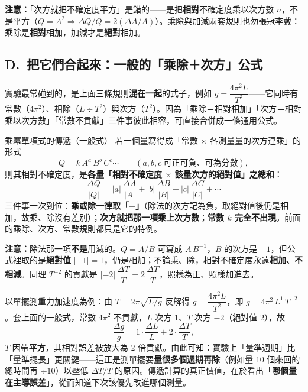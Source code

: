 \documentclass[11pt]{article}
\begin{document}
\textbf{注意：}「次方就把不確定度平方」是錯的——是把\textbf{相對}不確定度乘以次方數 $n$，不是平方（$Q=A^2\Rightarrow \Delta Q/Q=2(\Delta A/A)$）。乘除與加減兩套規則也勿張冠李戴：乘除是\textbf{相對}相加，加減才是\textbf{絕對}相加。

\subsection*{\sffamily D.\ 把它們合起來：一般的「乘除＋次方」公式}

實驗最常碰到的，是上面三條規則\textbf{混在一起}的式子，例如 $g = \dfrac{4\pi^2 L}{T^2}$——它同時有常數（$4\pi^2$）、相除（$L\div T^2$）與次方（$T^2$）。因為「乘除＝相對相加」「次方＝相對乘以次方數」「常數不貢獻」三件事彼此相容，可直接合併成一條通用公式。

\begin{補充框}{乘冪單項式的傳遞（一般式）}
若一個量寫得成「常數 $\times$ 各測量量的次方連乘」的形式
$$Q = k\,A^{a}\,B^{b}\,C^{c}\cdots\qquad(a,b,c\ \text{可正可負、可為分數}),$$
則其相對不確定度，是\textbf{各量「相對不確定度 $\times$ 該量次方的絕對值」之總和}：
$$\boxed{\ \frac{\Delta Q}{|Q|} = |a|\,\frac{\Delta A}{|A|} + |b|\,\frac{\Delta B}{|B|} + |c|\,\frac{\Delta C}{|C|} + \cdots\ }$$
三件事一次到位：\textbf{乘或除一律取「$+$」}（除法的次方記為負，取絕對值後仍是相加，故乘、除沒有差別）；\textbf{次方就把那一項乘上次方數}；\textbf{常數 $k$ 完全不出現}。前面的乘除、次方、常數規則都只是它的特例。
\end{補充框}

\textbf{注意：}除法那一項\textbf{不是}用減的。$Q=A/B$ 可寫成 $A\,B^{-1}$，$B$ 的次方是 $-1$，但公式裡取的是\textbf{絕對值} $|-1|=1$，仍是相加；不論乘、除，相對不確定度永遠\textbf{相加、不相減}。同理 $T^{-2}$ 的貢獻是 $|-2|\,\dfrac{\Delta T}{T}=2\,\dfrac{\Delta T}{T}$，照樣為正、照樣加進去。

\medskip
以單擺測重力加速度為例：由 $T=2\pi\sqrt{L/g}$ 反解得 $g=\dfrac{4\pi^2 L}{T^2}$，即 $g = 4\pi^2\,L^{1}\,T^{-2}$。套上面的一般式，常數 $4\pi^2$ 不貢獻，$L$ 次方 $1$、$T$ 次方 $-2$（絕對值 $2$），故
$$\frac{\Delta g}{g} = 1\cdot\frac{\Delta L}{L} + 2\cdot\frac{\Delta T}{T},$$
$T$ 因帶\textbf{平方}，其相對誤差被放大為 2 倍貢獻。由此可知：實驗上「量準週期」比「量準擺長」更關鍵——這正是測單擺要\textbf{量很多個週期再除}（例如量 10 個來回的總時間再 $\div 10$）以壓低 $\Delta T/T$ 的原因。傳遞計算的真正價值，在於看出「\textbf{哪個量在主導誤差}」，從而知道下次該優先改進哪個測量。

\end{document}
